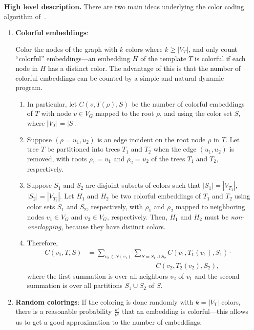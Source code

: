 \noindent
\textbf{High level description.}
There are two main ideas underlying the color coding algorithm of~\cite{alon1995color}.
\begin{enumerate}[leftmargin=4mm, noitemsep, topsep=0pt]
\item
\textbf{Colorful embeddings}:

Color the nodes of the graph with $k$ colors where $k \geq |V_T|$, and only count
``colorful'' embeddings---an embedding $H$ of the template $T$ is colorful if
each node in $H$ has a distinct color.  The advantage of this is that the number
of colorful embeddings can be counted by a simple and natural dynamic program.

\begin{enumerate}
\item
In particular, let $C(v, T(\rho), S)$ be the number of colorful embeddings of $T$ with node
$v \in V_G$ mapped to the root $\rho$, and using the color set $S$, where
$|V_{T}| = |S|$. 
\item
Suppose $(\rho=u_1, u_2)$ is an edge incident on the root node
$\rho$ in $T$. Let tree $T$ be partitioned into trees $T_1$ and $T_2$ when the
edge $(u_1, u_2)$ is removed, with roots $\rho_1=u_1$ and $\rho_2=u_2$ of the
trees $T_1$ and $T_2$, respectively.
\item
Suppose $S_1$ and $S_2$ are disjoint subsets of colors
such that $|S_1|=|V_{T_1}|$, $|S_2| = |V_{T_2}|$. Let $H_1$ and $H_2$ be two
colorful embeddings of $T_1$ and $T_2$ using color sets $S_1$ and $S_2$, respectively,
with $\rho_1$ and $\rho_2$ mapped to neighboring nodes $v_1\in V_G$ and
$v_2\in V_G$, respectively. Then, $H_1$ and $H_2$ must be \emph{non-overlapping},
because they have distinct colors.
\item
Therefore, 
\begin{align*}
C(v_1, T, S) & = \sum_{v_2\in N(v_1)} \sum_{S=S_1\cup S_2} C(v_1, T_1(v_1), S_1) \cdot\\
& \qquad \qquad \qquad \qquad  \qquad C(v_2, T_2(v_2), S_2),
\end{align*}
where the first summation is over all neighbors $v_2$ of $v_1$ and the
second summation is over all partitions $S_1\cup S_2$ of $S$.
\end{enumerate}
\item
\textbf{Random colorings}:
If the coloring is done randomly with $k=|V_T|$ colors, there is a reasonable
probability $\frac{k!}{k^k}$ that an embedding is colorful---this allows us to
get a good approximation to the number of embeddings.
\end{enumerate}

